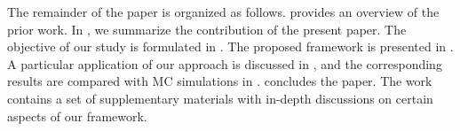 The remainder of the paper is organized as follows.
 provides an overview of the prior work.
In , we summarize the contribution of the present paper.
The objective of our study is formulated in .
The proposed framework is presented in .
A particular application of our approach is discussed in , and the corresponding results are compared with MC simulations in .
 concludes the paper.
The work contains a set of supplementary materials with in-depth discussions on certain aspects of our framework.
